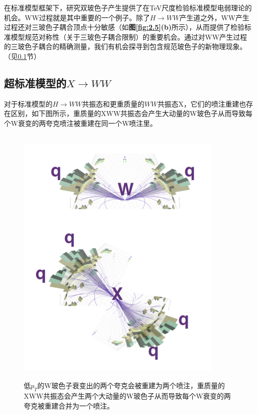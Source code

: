在标准模型框架下，研究双玻色子产生提供了在TeV尺度检验标准模型电弱理论的机会。WW过程就是其中重要的一个例子。除了$H\to WW$产生道之外，WW产生过程还对三玻色子耦合顶点十分敏感（如\textbf{图\ref{fig:2.5}(b)}所示），从而提供了检验标准模型规范对称性（关于三玻色子耦合限制）的重要机会。通过对WW产生过程的三玻色子耦合的精确测量，我们有机会探寻到包含规范玻色子的新物理现象。（见\ref{sec:2.3.2}节）

\subsection{超标准模型的$X\to WW$}\label{sec:2.3.2}
对于标准模型的$H\to WW$共振态和更重质量的$WW$共振态X，它们的喷注重建也存在区别，如下图所示，重质量的XWW共振态会产生大动量的W玻色子从而导致每个W衰变的两夸克喷注被重建在同一个W喷注里。
\begin{figure}[H]
 \centering
 \includegraphics[height=13cm, width=10cm]{pictures/massiveXWW.png}
  \caption{低$p_T$的W玻色子衰变出的两个夸克会被重建为两个喷注，重质量的XWW共振态会产生两个大动量的W玻色子从而导致每个W衰变的两夸克被重建合并为一个喷注。\cite{Boosting_the_Higgs_boson}}
 \label{fig:2.6}
\end{figure}

